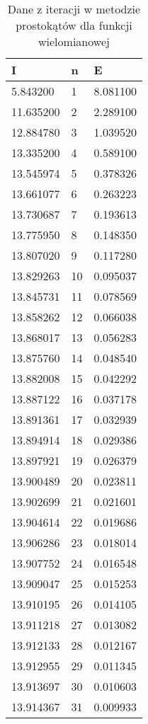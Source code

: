 \documentclass[12pt,twoside]{article}
\begin{document}
\begin{table}[H]
\centering 
\caption{Dane z iteracji w metodzie prostokątów dla funkcji wielomianowej}
\label{tabela1.1}
\begin{tabular}{lll}
\toprule
  I &  n &      E \\
\midrule
 5.843200 &       1 & 8.081100 \\
11.635200 &       2 & 2.289100 \\
12.884780 &       3 & 1.039520 \\
13.335200 &       4 & 0.589100 \\
13.545974 &       5 & 0.378326 \\
13.661077 &       6 & 0.263223 \\
13.730687 &       7 & 0.193613 \\
13.775950 &       8 & 0.148350 \\
13.807020 &       9 & 0.117280 \\
13.829263 &      10 & 0.095037 \\
13.845731 &      11 & 0.078569 \\
13.858262 &      12 & 0.066038 \\
13.868017 &      13 & 0.056283 \\
13.875760 &      14 & 0.048540 \\
13.882008 &      15 & 0.042292 \\
13.887122 &     16 & 0.037178 \\
13.891361 &      17 & 0.032939 \\
13.894914 &      18 &0.029386 \\
13.897921 &      19 & 0.026379 \\
13.900489 &      20 & 0.023811 \\
13.902699 &      21 & 0.021601 \\
13.904614 &      22 & 0.019686 \\
13.906286 &      23 & 0.018014 \\
13.907752 &      24 & 0.016548 \\
13.909047 &      25 & 0.015253 \\
13.910195 &      26 & 0.014105 \\
13.911218 &      27 & 0.013082 \\
13.912133 &      28 & 0.012167 \\
13.912955 &      29 & 0.011345 \\
13.913697 &      30 & 0.010603 \\
13.914367 &      31 & 0.009933 \\
\bottomrule
\end{tabular}
\end{table}
\end{document}

